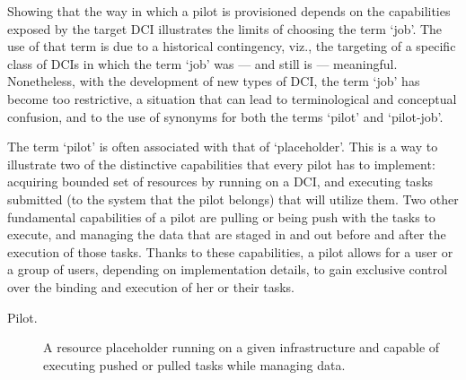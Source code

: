 \documentclass{sig-alternate}
\begin{document}
Showing that the way in which a pilot is provisioned depends on the
capabilities exposed by the target DCI illustrates the limits of
choosing the term `job'. The use of that term is due to a historical
contingency, viz., the targeting of a specific class of DCIs in which
the term `job' was --- and still is --- meaningful. Nonetheless, with
the development of new types of DCI, the term `job' has become too
restrictive, a situation that can lead to terminological and
conceptual confusion, and to the use of synonyms for both the terms
`pilot' and `pilot-job'.

The term `pilot' is often associated with that of `placeholder'. This
is a way to illustrate two of the distinctive capabilities that every
pilot has to implement: acquiring bounded set of resources by running
on a DCI, and executing tasks submitted (to the system that the pilot
belongs) that will utilize them.   Two other fundamental capabilities of a pilot
are pulling or being push with the tasks to execute, and managing the
data that are staged in and out before and after the execution of
those tasks.  Thanks to these capabilities, a pilot allows for a user
or a group of users, depending on implementation details, to gain
exclusive control over the binding and execution of her or their
tasks.

\begin{description}
\item[Pilot.] A resource placeholder running on a given infrastructure
  and capable of executing pushed or pulled tasks while managing
  data.

\end{description}
\end{document}
